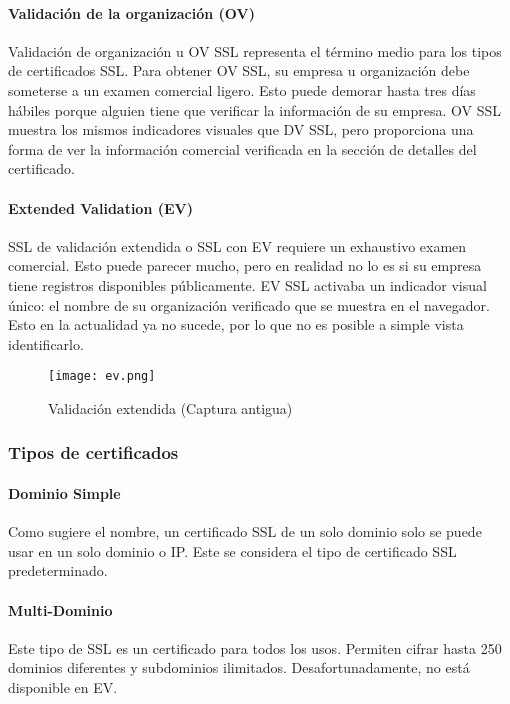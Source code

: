 \paragraph*{Validación de la organización (OV)}
Validación de organización u OV SSL representa el término medio para los tipos de 
certificados SSL. Para obtener OV SSL, su empresa u organización debe someterse a 
un examen comercial ligero. Esto puede demorar hasta tres días hábiles porque alguien 
tiene que verificar la información de su empresa. OV SSL muestra los mismos indicadores 
visuales que DV SSL, pero proporciona una forma de ver la 
información comercial verificada en la sección de detalles del certificado. 

\paragraph*{Extended Validation (EV)}
SSL de validación extendida o SSL con EV requiere un exhaustivo examen comercial. 
Esto puede parecer mucho, pero en realidad no lo es si su empresa tiene 
registros disponibles públicamente. EV SSL activaba un indicador visual único: el 
nombre de su organización verificado que se muestra en el navegador. Esto en la 
actualidad ya no sucede, por lo que no es posible a simple vista identificarlo.

\begin{center}
   \begin{figure}   
      \begin{center}
         \texttt{[image: ev.png]}
      \end{center}
      \caption{Validación extendida (Captura antigua)}
   \end{figure}
\end{center}

  \subsubsection*{Tipos de certificados}

  \paragraph*{Dominio Simple}
  Como sugiere el nombre, un certificado SSL de un solo dominio solo 
  se puede usar en un solo dominio o IP. Este se considera el tipo de 
  certificado SSL predeterminado. 
  
  \paragraph*{Multi-Dominio}
  Este tipo de SSL es un certificado para todos los usos. Permiten cifrar 
  hasta 250 dominios diferentes y subdominios 
  ilimitados. Desafortunadamente, no está disponible en EV.
  
